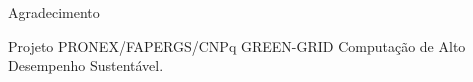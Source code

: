 \frame
{
\frametitle{}
	
	\begin{block}{Agradecimento}

		Projeto PRONEX/FAPERGS/CNPq GREEN-GRID Computação de Alto Desempenho Sustentável.
	\end{block}
}





